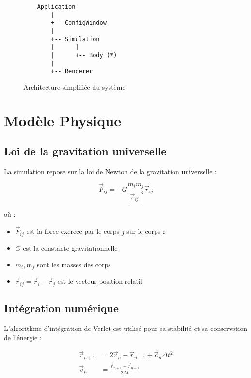 \documentclass[12pt,a4paper]{article}
\begin{document}
\begin{figure}[h]
\centering
\begin{minipage}{0.8\textwidth}
\begin{verbatim}
    Application
        |
        +-- ConfigWindow
        |
        +-- Simulation
        |      |
        |      +-- Body (*)
        |
        +-- Renderer
\end{verbatim}
\end{minipage}
\caption{Architecture simplifiée du système}
\end{figure}

\section{Modèle Physique}

\subsection{Loi de la gravitation universelle}

La simulation repose sur la loi de Newton de la gravitation universelle :

\begin{equation}
\vec{F}_{ij} = -G \frac{m_i m_j}{|\vec{r}_{ij}|^3} \vec{r}_{ij}
\end{equation}

où :
\begin{itemize}
    \item $\vec{F}_{ij}$ est la force exercée par le corps $j$ sur le corps $i$
    \item $G$ est la constante gravitationnelle
    \item $m_i, m_j$ sont les masses des corps
    \item $\vec{r}_{ij} = \vec{r}_i - \vec{r}_j$ est le vecteur position relatif
\end{itemize}

\subsection{Intégration numérique}

L'algorithme d'intégration de Verlet est utilisé pour sa stabilité et sa conservation de l'énergie :

\begin{align}
\vec{r}_{n+1} &= 2\vec{r}_n - \vec{r}_{n-1} + \vec{a}_n \Delta t^2\\
\vec{v}_n &= \frac{\vec{r}_{n+1} - \vec{r}_{n-1}}{2\Delta t}
\end{align}
\end{document}
